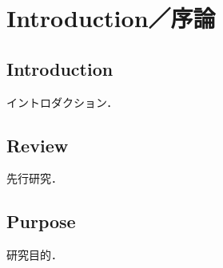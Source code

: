 \chapter{Introduction／序論}
\label{chap_Introduction}

\section{Introduction}
イントロダクション．

\section{Review}
先行研究．

\section{Purpose}
研究目的．

